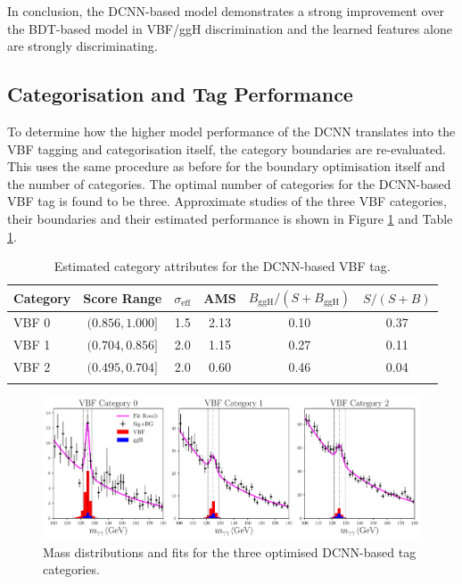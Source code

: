 In conclusion, the DCNN-based model demonstrates a strong improvement over the BDT-based model in VBF/ggH discrimination and the learned features alone are strongly discriminating. 












\subsection{Categorisation and Tag Performance}
To determine how the higher model performance of the DCNN translates into the VBF tagging and categorisation itself, the category boundaries are re-evaluated. 
This uses the same procedure as before for the boundary optimisation itself and the number of categories. 
The optimal number of categories for the DCNN-based VBF tag is found to be three.
Approximate studies of the three VBF categories, their boundaries and their estimated performance is shown in Figure \ref{fig:event_categorisation:DCNN_mass_fits} and Table \ref{tab:event_selection:DCNN_cats}.
\begin{table}[h!]
    \centering
    \renewcommand{\arraystretch}{1.3}
    \begin{tabular}{ l | c c c c c }
        \thickhline
        Category & Score Range & $\sigma_{\mathrm{eff}}$ & AMS & $B_{\mathrm{ggH}}/(S+B_{\mathrm{ggH}})$ & $S/(S+B)$ \\
        \hline
        VBF 0 & $(0.856, 1.000]$ & 1.5 &  2.13 & 0.10 & 0.37 \\
        VBF 1 & $(0.704, 0.856]$ & 2.0 &  1.15 & 0.27 & 0.11 \\
        VBF 2 & $(0.495, 0.704]$ & 2.0 &  0.60 & 0.46 & 0.04 \\
        \thickhline
    \end{tabular}
    \caption{Estimated category attributes for the DCNN-based VBF tag.}
    \label{tab:event_selection:DCNN_cats}
\end{table}
\begin{figure}[h!]
    \centering
    \includegraphics[width=1.0\textwidth]{figures/event_selection/DCNN_mass_fits.pdf}
    \caption{Mass distributions and fits for the three optimised DCNN-based tag categories.}
    \label{fig:event_categorisation:DCNN_mass_fits}
\end{figure}

